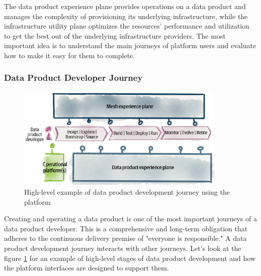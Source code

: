 \documentclass[12pt, a4paper]{book}
\begin{document}
The data product experience plane provides operations on a data product and manages the complexity of provisioning its underlying infrastructure, while the infrastructure utility plane optimizes the resources' performance and utilization to get the best out of the underlying infrastructure providers. The most important idea is to understand the main journeys of platform users and evaluate how to make it easy for them to complete.
\vspace{-.3cm}
\subsubsection*{Data Product Developer Journey}
\begin{figure}[h]
	\begin{framed}
		\centering
		\includegraphics[width=10cm]{DataProductDevJourney.png}
		\caption{High-level example of data product development journey using the platform}
		\label{DataProductDevJourney}
	\end{framed}
\end{figure}

Creating and operating a data product is one of the most important journeys of a data product developer. This is a comprehensive and long-term obligation that adheres to the continuous delivery premise of "everyone is responsible." A data product development journey interacts with other journeys. Let’s look at the figure \ref{DataProductDevJourney} for an example of high-level stages of data product development and how the platform interfaces are designed to support them.
\end{document}
